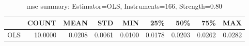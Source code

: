 \begin{table}[ht]
\centering
\caption{mse summary: Estimator=OLS, Instruments=166, Strength=0.80}
\begin{tabular}{lrrrrrrrr}
\toprule
 & COUNT & MEAN & STD & MIN & 25\% & 50\% & 75\% & MAX \\
\midrule
OLS & 10.0000 & 0.0208 & 0.0061 & 0.0100 & 0.0178 & 0.0203 & 0.0262 & 0.0282 \\
\bottomrule
\end{tabular}
\end{table}
